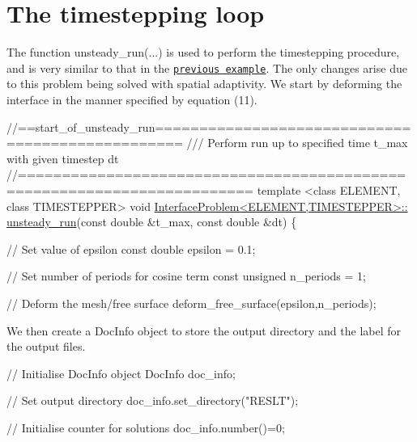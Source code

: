  

\hypertarget{index_unsteady_run}{}\section{The timestepping loop}\label{index_unsteady_run}
The function {\ttfamily unsteady\+\_\+run}(...) is used to perform the timestepping procedure, and is very similar to that in the \href{../../single_layer_free_surface/html/index.html#unsteady_run}{\tt previous example}. The only changes arise due to this problem being solved with spatial adaptivity. We start by deforming the interface in the manner specified by equation (11).


\begin{DoxyCodeInclude}
\textcolor{comment}{//==start\_of\_unsteady\_run=================================================}
\textcolor{comment}{/// Perform run up to specified time t\_max with given timestep dt}
\textcolor{comment}{}\textcolor{comment}{//========================================================================}
\textcolor{keyword}{template} <\textcolor{keyword}{class} ELEMENT, \textcolor{keyword}{class} TIMESTEPPER>
\textcolor{keywordtype}{void} \hyperlink{classInterfaceProblem_adf1f4e43d10939e4323e0e315b711085}{InterfaceProblem<ELEMENT,TIMESTEPPER>::}
\hyperlink{classInterfaceProblem_adf1f4e43d10939e4323e0e315b711085}{unsteady\_run}(\textcolor{keyword}{const} \textcolor{keywordtype}{double} &t\_max, \textcolor{keyword}{const} \textcolor{keywordtype}{double} &dt)
\{

 \textcolor{comment}{// Set value of epsilon}
 \textcolor{keyword}{const} \textcolor{keywordtype}{double} epsilon = 0.1;

 \textcolor{comment}{// Set number of periods for cosine term}
 \textcolor{keyword}{const} \textcolor{keywordtype}{unsigned} n\_periods = 1;

 \textcolor{comment}{// Deform the mesh/free surface}
 deform\_free\_surface(epsilon,n\_periods);

\end{DoxyCodeInclude}


We then create a {\ttfamily Doc\+Info} object to store the output directory and the label for the output files.


\begin{DoxyCodeInclude}
 \textcolor{comment}{// Initialise DocInfo object}
 DocInfo doc\_info;

 \textcolor{comment}{// Set output directory}
 doc\_info.set\_directory(\textcolor{stringliteral}{"RESLT"});

 \textcolor{comment}{// Initialise counter for solutions}
 doc\_info.number()=0;

\end{DoxyCodeInclude}


